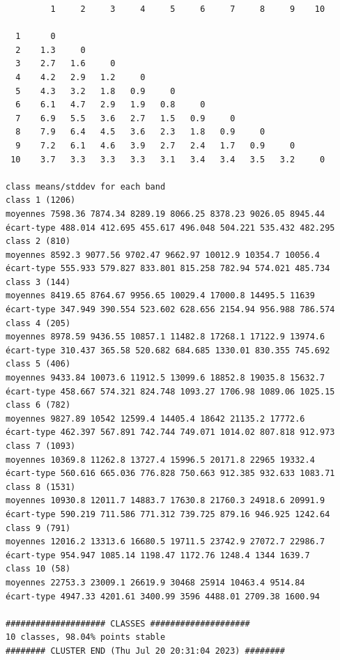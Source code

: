 \documentclass[land,article,submit,pdftex,moreauthors]{Definitions/mdpi}
\begin{document}
\begin{scriptsize}
\begin{verbatim}
         1     2     3     4     5     6     7     8     9    10

  1      0
  2    1.3     0
  3    2.7   1.6     0
  4    4.2   2.9   1.2     0
  5    4.3   3.2   1.8   0.9     0
  6    6.1   4.7   2.9   1.9   0.8     0
  7    6.9   5.5   3.6   2.7   1.5   0.9     0
  8    7.9   6.4   4.5   3.6   2.3   1.8   0.9     0
  9    7.2   6.1   4.6   3.9   2.7   2.4   1.7   0.9     0
 10    3.7   3.3   3.3   3.3   3.1   3.4   3.4   3.5   3.2     0

class means/stddev for each band
class 1 (1206)
moyennes 7598.36 7874.34 8289.19 8066.25 8378.23 9026.05 8945.44
écart-type 488.014 412.695 455.617 496.048 504.221 535.432 482.295
class 2 (810)
moyennes 8592.3 9077.56 9702.47 9662.97 10012.9 10354.7 10056.4
écart-type 555.933 579.827 833.801 815.258 782.94 574.021 485.734
class 3 (144)
moyennes 8419.65 8764.67 9956.65 10029.4 17000.8 14495.5 11639
écart-type 347.949 390.554 523.602 628.656 2154.94 956.988 786.574
class 4 (205)
moyennes 8978.59 9436.55 10857.1 11482.8 17268.1 17122.9 13974.6
écart-type 310.437 365.58 520.682 684.685 1330.01 830.355 745.692
class 5 (406)
moyennes 9433.84 10073.6 11912.5 13099.6 18852.8 19035.8 15632.7
écart-type 458.667 574.321 824.748 1093.27 1706.98 1089.06 1025.15
class 6 (782)
moyennes 9827.89 10542 12599.4 14405.4 18642 21135.2 17772.6
écart-type 462.397 567.891 742.744 749.071 1014.02 807.818 912.973
class 7 (1093)
moyennes 10369.8 11262.8 13727.4 15996.5 20171.8 22965 19332.4
écart-type 560.616 665.036 776.828 750.663 912.385 932.633 1083.71
class 8 (1531)
moyennes 10930.8 12011.7 14883.7 17630.8 21760.3 24918.6 20991.9
écart-type 590.219 711.586 771.312 739.725 879.16 946.925 1242.64
class 9 (791)
moyennes 12016.2 13313.6 16680.5 19711.5 23742.9 27072.7 22986.7
écart-type 954.947 1085.14 1198.47 1172.76 1248.4 1344 1639.7
class 10 (58)
moyennes 22753.3 23009.1 26619.9 30468 25914 10463.4 9514.84
écart-type 4947.33 4201.61 3400.99 3596 4488.01 2709.38 1600.94

#################### CLASSES ####################
10 classes, 98.04% points stable
######## CLUSTER END (Thu Jul 20 20:31:04 2023) ########
\end{verbatim}
\end{scriptsize}
\end{document}
